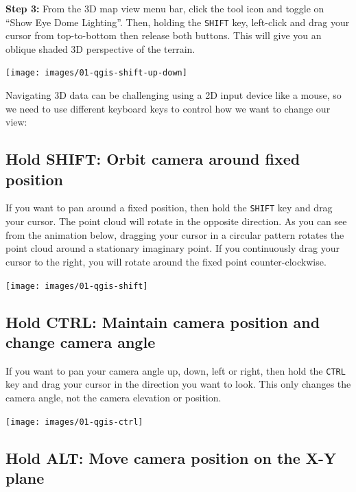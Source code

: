 \documentclass[
]{book}
\begin{document}
\textbf{Step 3:} From the 3D map view menu bar, click the tool icon and toggle on ``Show Eye Dome Lighting''. Then, holding the \texttt{SHIFT} key, left-click and drag your cursor from top-to-bottom then release both buttons. This will give you an oblique shaded 3D perspective of the terrain.

\texttt{[image: images/01-qgis-shift-up-down]}

Navigating 3D data can be challenging using a 2D input device like a mouse, so we need to use different keyboard keys to control how we want to change our view:

\hypertarget{hold-shift-orbit-camera-around-fixed-position}{%
\subsection*{Hold SHIFT: Orbit camera around fixed position}\label{hold-shift-orbit-camera-around-fixed-position}}

If you want to pan around a fixed position, then hold the \texttt{SHIFT} key and drag your cursor. The point cloud will rotate in the opposite direction. As you can see from the animation below, dragging your cursor in a circular pattern rotates the point cloud around a stationary imaginary point. If you continuously drag your cursor to the right, you will rotate around the fixed point counter-clockwise.

\texttt{[image: images/01-qgis-shift]}

\hypertarget{hold-ctrl-maintain-camera-position-and-change-camera-angle}{%
\subsection*{Hold CTRL: Maintain camera position and change camera angle}\label{hold-ctrl-maintain-camera-position-and-change-camera-angle}}

If you want to pan your camera angle up, down, left or right, then hold the \texttt{CTRL} key and drag your cursor in the direction you want to look. This only changes the camera angle, not the camera elevation or position.

\texttt{[image: images/01-qgis-ctrl]}

\hypertarget{hold-alt-move-camera-position-on-the-x-y-plane}{%
\subsection*{Hold ALT: Move camera position on the X-Y plane}\label{hold-alt-move-camera-position-on-the-x-y-plane}}
\end{document}
